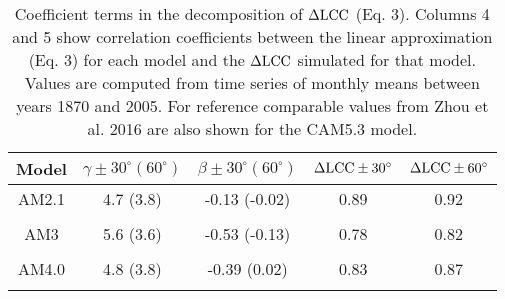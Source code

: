\documentclass[draft,grl]{agutexSI}
\begin{document}
\begin{table}
    \caption{Coefficient terms in the decomposition of $\Delta \rm{LCC}$ (Eq. 3).  %
    Columns 4 and 5 show correlation coefficients between the linear approximation (Eq. 3) for  each model and the $\Delta \rm{LCC}$ simulated for that model.  
 Values are computed from time series of monthly means between years 1870 and 2005.  For reference comparable values from
 Zhou et al. 2016 are also shown for the CAM5.3 model.}
    \begin{center}
    \begin{tabular}{*{5}{c}}
    \hline
    \hline
    Model      & $\gamma \pm 30^{\circ} (60^{\circ})$               & $\beta \pm 30^{\circ} (60^{\circ})$          & $\Delta \rm{LCC} \pm 30^{\circ}$      &   $\Delta \rm{LCC} \pm 60^{\circ}$  \\ \hline
    AM2.1           &   4.7 (3.8)                  &    -0.13 (-0.02)                       &         0.89                       &    0.92                              \\
    \\
    AM3             & 5.6   (3.6)                   &  -0.53 (-0.13)                       &         0.78                       &   0.82                      \\ 
    \\
    AM4.0        & 4.8   (3.8)                    &  -0.39  (0.02)                   &          0.83                          &   0.87                           \\ 
    \\

\end{tabular}
\end{center}
\end{table}
\end{document}
